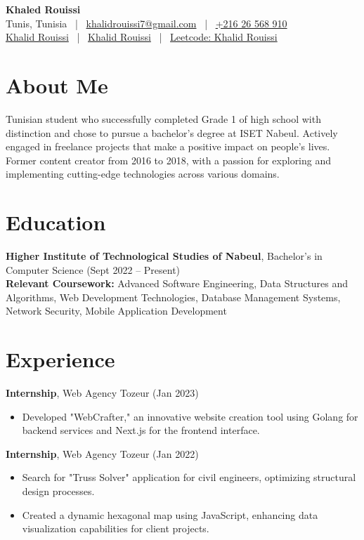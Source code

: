 \documentclass[11pt,letterpaper]{article}
\begin{document}
\begin{center}
    \Large\textbf{Khaled Rouissi}\\[0.2cm]
    \small
    Tunis, Tunisia \ | \ \href{mailto:khalidrouissi7@gmail.com}{khalidrouissi7@gmail.com} \ | \ \href{tel:+216-26-568-910}{+216 26 568 910}\\
    \href{https://linkedin.com/in/khalid-rouissi-6a136b242}{\faLinkedin Khalid Rouissi} \ | \ \href{https://github.com/KhalidRouissi1}{\faGithub Khalid Rouissi}
    \ | \ \href{https://leetcode.com/u/KhalidRouissi1/}{Leetcode: Khalid Rouissi}
\end{center}

\section{About Me}
Tunisian student who successfully completed Grade 1 of high school with distinction and chose to pursue a bachelor's degree at ISET Nabeul. Actively engaged in freelance projects that make a positive impact on people's lives. Former content creator from 2016 to 2018, with a passion for exploring and implementing cutting-edge technologies across various domains.

\section{Education}
\textbf{Higher Institute of Technological Studies of Nabeul}, Bachelor's in Computer Science (Sept 2022 – Present)\\
\textbf{Relevant Coursework:} Advanced Software Engineering, Data Structures and Algorithms, Web Development Technologies, Database Management Systems, Network Security, Mobile Application Development

\section{Experience}
\textbf{Internship}, Web Agency Tozeur (Jan 2023)
\begin{itemize}[leftmargin=*, itemsep=1pt]
    \item Developed "WebCrafter," an innovative website creation tool using Golang for backend services and Next.js for the frontend interface.
\end{itemize}

\textbf{Internship}, Web Agency Tozeur (Jan 2022)
\begin{itemize}[leftmargin=*, itemsep=1pt]
    \item Search for "Truss Solver" application for civil engineers, optimizing structural design processes.
    \item Created a dynamic hexagonal map using JavaScript, enhancing data visualization capabilities for client projects.
\end{itemize}
\end{document}
